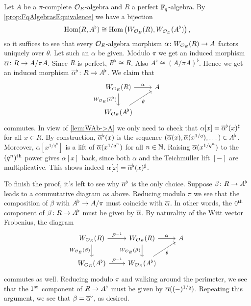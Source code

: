\begin{proof*}
	Let $A$ be a $\pi$-complete $\mathcal{O}_E$-algebra and $R$ a perfect $\mathbb{F}_q$-algebra. By \cref{prop:FqAlgebrasEquivalence} we have a bijection
	\begin{equation*}
		\operatorname{Hom}(R,A^\flat)\cong \operatorname{Hom}\big(W_{\mathcal{O}_E}(R),W_{\mathcal{O}_E}(A^\flat)\big)\,,
	\end{equation*}
	so it suffices to see that every $\mathcal{O}_E$-algebra morphism $\alpha\colon W_{\Oo_E}(R)\morphism A$ factors uniquely over $\theta$. Let such an $\alpha$ be given. Modulo $\pi$ we get an induced morphism $\ov{\alpha}\colon R\morphism A/\pi A$. Since $R$ is perfect, $R^\flat\cong R$. Also $A^\flat\cong (A/\pi A)^\flat$. Hence we get an induced morphism $\ov{\alpha}^\flat\colon R\morphism A^\flat$. We claim that
	\begin{equation*}
		\begin{tikzcd}
			W_{\Oo_E}(R)\dar["W_{\Oo_E}(\ov{\alpha}^\flat)"{swap}]\rar["\alpha"]& A\\
			W_{\Oo_E}(A^\flat)\urar["\theta"{swap}]&
		\end{tikzcd}
	\end{equation*}
	commutes. In view of \cref{lem:WAb->A} we only need to check that $\alpha[x]=\ov{\alpha}^\flat(x)^\sharp$ for all $x\in R$. By construction, $\ov{\alpha}^\flat(x)$ is the sequence $(\ov{\alpha}(x),\ov{\alpha}(x^{1/q}),\dotsc)\in A^\flat$. Moreover, $\alpha[x^{1/q^n}]$ is a lift of $\ov{\alpha}(x^{1/q^n})$ for all $n\in\mathbb{N}$. Raising $\ov{\alpha}(x^{1/q^n})$ to the $(q^n)^{\text{th}}$ power gives $\alpha[x]$ back, since both $\alpha$ and the Teichmüller lift $[-]$ are multiplicative. This shows indeed $\alpha[x]=\ov{\alpha}^\flat(x)^\sharp$.
	
	To finish the proof, it's left to see why $\ov{\alpha}^\flat$ is the only choice. Suppose $\beta\colon R\morphism A^\flat$ leads to a commutative diagram as above. Reducing modulo $\pi$ we see that the composition of $\beta$ with $A^\flat\morphism A/\pi$ must coincide with $\ov{\alpha}$. In other words, the $0^{\text{th}}$ component of $\beta\colon R\morphism A^\flat$ must be given by $\ov{\alpha}$. By naturality of the Witt vector Frobenius, the diagram
	\begin{equation*}
		\begin{tikzcd}
		W_{\Oo_E}(R)\rar["F^{-1}"]\dar["W_{\Oo_E}(\beta)"{swap}"]& W_{\Oo_E}(R)\dar["W_{\Oo_E}(\beta)"{swap}]\rar["\alpha"]& A\\
		W_{\Oo_E}(A^\flat)\rar["F^{-1}"] & W_{\Oo_E}(A^\flat)\urar["\theta"{swap}]&
		\end{tikzcd}
	\end{equation*}
	commutes as well. Reducing modulo $\pi$ and walking around the perimeter, we see that the $1^{\text{st}}$ component of $R\morphism A^\flat$ must be given by $\ov{\alpha}((-)^{1/q})$. Repeating this argument, we see that $\beta=\ov{\alpha}^\flat$, as desired.
\end{proof*}
